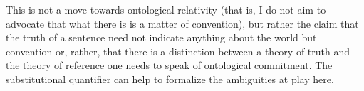 This is not a move towards ontological relativity (that is, I do not
aim to advocate that what there is is a matter of convention), but
rather the claim that the truth of a sentence need not indicate
anything about the world but convention or, rather, that there is a
distinction between a theory of truth and the theory of reference one
needs to speak of ontological commitment.  The substitutional
quantifier can help to formalize the ambiguities at play here.

